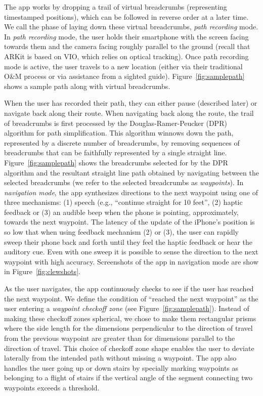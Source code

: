 \documentclass[chi_draft]{sigchi}
\newcommand{\OM}{O\&M\xspace}
\begin{document}
The app works by dropping a trail of virtual breadcrumbs (representing timestamped positions), which can be followed in reverse order at a later time.  We call the phase of laying down these virtual breadcrumbs, \emph{path recording} mode.  In \emph{path recording} mode, the user holds their smartphone with the screen facing towards them and the camera facing roughly parallel to the ground (recall that ARKit is based on VIO, which relies on optical tracking).  Once path recording mode is active, the user travels to a new location (either via their traditional \OM process or via assistance from a sighted guide).  Figure~\ref{fig:samplepath} shows a sample path along with virtual breadcrumbs.%

When the user has recorded their path, they can either pause (described later) or navigate back along their route.  When navigating back along the route, the trail of breadcrumbs is first processed by the Douglas-Ramer-Peucker (DPR) algorithm \cite{douglas1973algorithms} for path simplification.  This algorithm winnows down the path, represented by a discrete number of breadcrumbs, by removing sequences of breadcrumbs that can be faithfully represented by a single straight line.  Figure~\ref{fig:samplepath} shows the breadcrumbs selected for by the DPR algorithm and the resultant  straight line path obtained by navigating between the selected breadcrumbs (we refer to the selected breadcrumbs as \emph{waypoints}).  In \emph{navigation mode}, the app synthesizes directions to the next waypoint using one of three mechanisms: (1) speech (e.g., ``continue straight for 10 feet'', (2) haptic feedback or (3) an audible beep when the phone is pointing, approximately, towards the next waypoint.  The latency of the update of the iPhone's position is so low that when using feedback mechanism (2) or (3), the user can rapidly sweep their phone back and forth until they feel the haptic feedback or hear the auditory cue.  Even with one sweep it is possible to sense the direction to the next waypoint with high accuracy.  Screenshots of the app in navigation mode are show in Figure~\ref{fig:clewshots}.

As the user navigates, the app continuously checks to see if the user has reached the next waypoint.  We define the condition of ``reached the next waypoint'' as the user entering a \emph{waypoint checkoff zone} (see Figure~\ref{fig:samplepath}).  Instead of making these checkoff zones spherical, we chose to make them rectangular prisms where the side length for the dimensions perpendicular to the direction of travel from the previous waypoint are greater than for dimensions parallel to the direction of travel.  This choice of checkoff zone shape enables the user to deviate laterally from the intended path without missing a waypoint.  The app also handles the user going up or down stairs by specially marking waypoints as belonging to a flight of stairs if the vertical angle of the segment connecting two waypoints exceeds a threshold.
\end{document}
